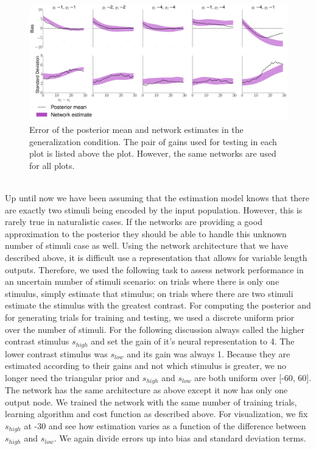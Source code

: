 \documentclass{article} %
\begin{document}
\begin{figure}[h]
\centering
\includegraphics[width = \textwidth]{High-Low_Gains.png}
\caption{Error of the posterior mean and network estimates in the generalization condition. The pair of gains used for testing in each plot is listed above the plot. However, the same networks are used for all plots.}
\end{figure}
\\
Up until now we have been assuming that the estimation model knows that there are exactly two stimuli being encoded by the input population. However, this is rarely true in naturalistic cases. If the networks are providing a good approximation to the posterior they should be able to handle this unknown number of stimuli case as well. Using the network architecture that we have described above, it is difficult use a representation that allows for variable length outputs. Therefore, we used the following task to assess network performance in an uncertain number of stimuli scenario: on trials where there is only one stimulus, simply estimate that stimulus; on trials where there are two stimuli estimate the stimulus with the greatest contrast. For computing the posterior and for generating trials for training and testing, we used a discrete uniform prior over the number of stimuli. For the following discussion always called the higher contrast stimulus $s_{high}$ and set the gain of it's neural representation to 4. The lower contrast stimulus was $s_{low}$ and its gain was always 1. Because they are estimated according to their gains and not which stimulus is greater, we no longer need the triangular prior and $s_{high}$ and $s_{low}$ are both uniform over [-60, 60]. The network has the same architecture as above except it now has only one output node. We trained the network with the same number of training trials, learning algorithm and cost function as described above. For visualization, we fix $s_{high}$ at -30 and see how estimation varies as a function of the difference between $s_{high}$ and $s_{low}$. We again divide errors up into bias and standard deviation terms.
\end{document}
